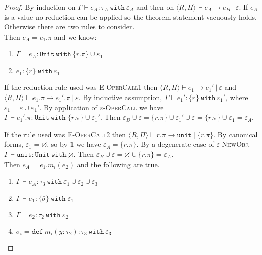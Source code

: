 \documentclass[a4paper,UKenglish]{lipics-v2016}
\newcommand{\kw}[1]{\mathtt{ #1 }~}
\newcommand{\kwa}[1]{\mathtt{ #1 }}
\newcommand{\rctx}[0]{ \langle R, \Pi \rangle }
\begin{document}
\begin{proof}
By induction on $\Gamma \vdash e_A: \tau_A~\kw{with} \varepsilon_A$ and then on $\rctx \vdash e_A \longrightarrow e_B~|~\varepsilon$. If $e_A$ is a value no reduction can be applied so the theorem statement vacuously holds. Otherwise there are two rules to consider.\\

\noindent
{}
Then $e_A = e_1.\pi$ and we know:

\begin{enumerate}
	\item $\Gamma \vdash e_A: \kwa{Unit}~\kw{with} \{ r.\pi \} \cup \varepsilon_1$
	\item $e_1: \{ r \}~\kw{with} \varepsilon_1$
\end{enumerate}

\noindent
If the reduction rule used was \textsc{E-OperCall1} then $\rctx \vdash e_1 \longrightarrow e_1'~|~\varepsilon$ and $\rctx \vdash e_1.\pi \longrightarrow e_1'.\pi~|~\varepsilon$. By inductive assumption, $\Gamma \vdash e_1': \{ r \}~\kw{with} \varepsilon_1'$, where $\varepsilon_1 = \varepsilon \cup \varepsilon_1'$. By application of \textsc{$\varepsilon$-OperCall} we have $\Gamma \vdash e_1'.\pi: \kwa{Unit}~\kw{with} \{ r.\pi \} \cup \varepsilon_1'$. Then $\varepsilon_B \cup \varepsilon = \{ r.\pi \} \cup \varepsilon_1' \cup \varepsilon = \{ r.\pi \} \cup \varepsilon_1 = \varepsilon_A$.

If the rule used was \textsc{E-OperCall2} then $\rctx \vdash r.\pi \longrightarrow \kwa{unit}~|~\{r.\pi\}$. By canonical forms, $\varepsilon_1 = \varnothing$, so by \textbf{1} we have $\varepsilon_A = \{ r.\pi \}$. By a degenerate case of \textsc{$\varepsilon$-NewObj}, $\Gamma \vdash \kwa{unit} : \kwa{Unit}~\kw{with} \varnothing$. Then $\varepsilon_B \cup \varepsilon = \varnothing \cup \{ r.\pi \} = \varepsilon_A$. \\

\noindent
{}
Then $e_A = e_1.m_i(e_2)$ and the following are true.

\begin{enumerate}
	\item $\Gamma \vdash e_A: \tau_3~\kw{with} \varepsilon_1 \cup \varepsilon_2 \cup \varepsilon_3$
	\item $\Gamma \vdash e_1: \{ \bar \sigma \}~\kw{with} \varepsilon_1$
	\item $\Gamma \vdash e_2: \tau_2~\kw{with} \varepsilon_2$
	\item $\sigma_i = \kw{def} m_i(y: \tau_2): \tau_3~\kw{with} \varepsilon_3$
\end{enumerate}


\end{proof}
\end{document}
